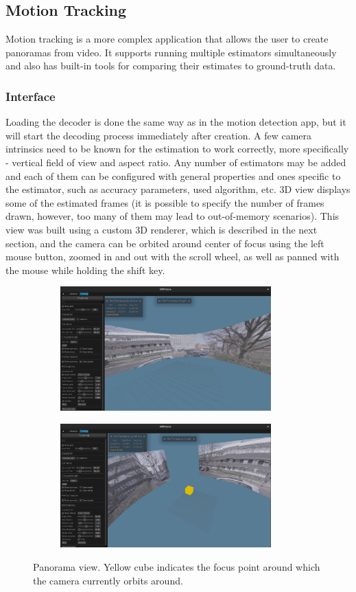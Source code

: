 \documentclass[11pt,english]{report}
\begin{document}
\subsection{Motion Tracking}

Motion tracking is a more complex application that allows the user to create panoramas from video. It supports running multiple estimators simultaneously and also has built-in tools for comparing their estimates to ground-truth data.

\subsubsection{Interface}

Loading the decoder is done the same way as in the motion detection app, but it will start the decoding process immediately after creation. A few camera intrinsics need to be known for the estimation to work correctly, more specifically - vertical field of view and aspect ratio. Any number of estimators may be added and each of them can be configured with general properties and ones specific to the estimator, such as accuracy parameters, used algorithm, etc. 3D view displays some of the estimated frames (it is possible to specify the number of frames drawn, however, too many of them may lead to out-of-memory scenarios). This view was built using a custom 3D renderer, which is described in the next section, and the camera can be orbited around center of focus using the left mouse button, zoomed in and out with the scroll wheel, as well as panned with the mouse while holding the shift key.

\begin{figure}[!ht]
	\centering
	\centering
	\begin{subfigure}{230pt}
		\includegraphics[width=230pt]{docs/report/panorama2.jpg}
	\end{subfigure}
	\begin{subfigure}{230pt}
		\includegraphics[width=230pt]{docs/report/panorama.jpg}
	\end{subfigure}
	\caption{\centering Panorama view. Yellow cube indicates the focus point around which the camera currently orbits around.}
\end{figure}
\end{document}
